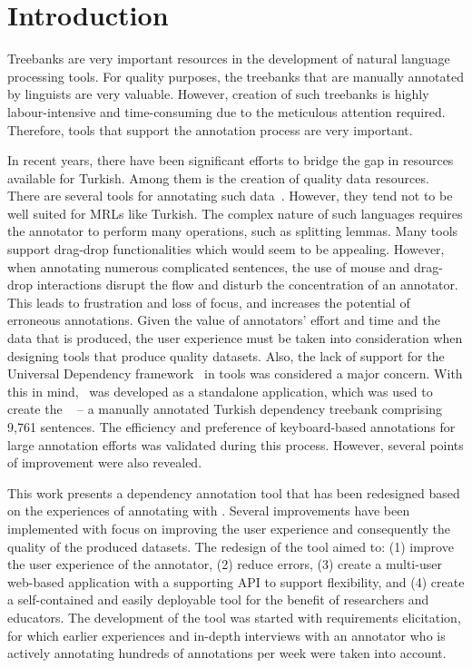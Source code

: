 \section{Introduction}
\label{sec:introduction}

Treebanks are very important resources in the development of natural language processing tools.
For quality purposes, the treebanks that are manually annotated by linguists are very valuable. 
However, creation of such treebanks is highly labour-intensive and time-consuming due to the meticulous attention required.
Therefore, tools that support the annotation process are very important. 

In recent years, there have been significant efforts to bridge the gap in resources available for Turkish. 
Among them is the creation of quality data resources. 
There are several tools for annotating such data~\cite{brat,dgannotator}. 
However, they tend not to be well suited for MRLs like Turkish.
The complex nature of such languages requires the annotator to perform many operations, such as splitting lemmas.
Many tools support drag-drop functionalities which would seem to be appealing. 
However, when annotating numerous complicated sentences, the use of mouse and drag-drop interactions disrupt the flow and disturb the concentration of an annotator. 
This leads to frustration and loss of focus, and increases the potential of erroneous annotations.
Given the value of annotators' effort and time and the data that is produced, the user experience must be taken into consideration when designing tools that produce quality datasets. 
Also, the lack of support for the Universal Dependency framework~\cite{UD} in tools was considered a major concern.
With this in mind, \boatvone\ was developed as a standalone application, which was used to create the \bountreebank~\cite{turk-etal-2019-turkish,trk2020resources,UD-Boun-Treebank} -- a manually annotated Turkish dependency treebank comprising 9,761 sentences.
The efficiency and preference of keyboard-based annotations for large annotation efforts was validated during this process. 
However, several points of improvement were also revealed.  

This work presents a dependency annotation tool that has been redesigned based on the experiences of annotating with \boatvone.
Several improvements have been implemented with focus on improving the user experience and consequently the quality of the produced datasets.
The redesign of the tool aimed to: (1) improve the user experience of the annotator, (2) reduce errors, (3) create a multi-user web-based application with a supporting API to support flexibility, and (4) create a self-contained and easily deployable tool for the benefit of researchers and educators. 
The development of the tool was started with requirements elicitation, for which earlier experiences and in-depth interviews with an annotator who is actively annotating hundreds of annotations per week were taken into account.

